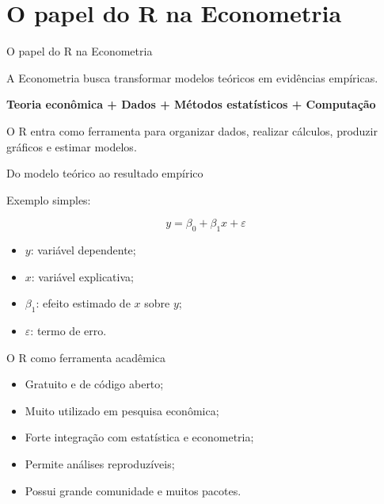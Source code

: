 \documentclass[11pt]{beamer}
\begin{document}
	\section{O papel do R na Econometria}
	
	\begin{frame}{O papel do R na Econometria}
		
		A Econometria busca transformar modelos teóricos em evidências empíricas.
		
		\vspace{0.4cm}
		
		\begin{center}
			\textbf{Teoria econômica + Dados + Métodos estatísticos + Computação}
		\end{center}
		
		\vspace{0.4cm}
		
		O R entra como ferramenta para organizar dados, realizar cálculos, produzir gráficos e estimar modelos.
		
	\end{frame}
	
	\begin{frame}{Do modelo teórico ao resultado empírico}
		
		Exemplo simples:
		
		\[
		y = \beta_0 + \beta_1x + \varepsilon
		\]
		
		\vspace{0.3cm}
		
		\begin{itemize}
			\item $y$: variável dependente;
			\item $x$: variável explicativa;
			\item $\beta_1$: efeito estimado de $x$ sobre $y$;
			\item $\varepsilon$: termo de erro.
		\end{itemize}
		
	\end{frame}
	
	\begin{frame}{O R como ferramenta acadêmica}
		
		\begin{itemize}
			\item Gratuito e de código aberto;
			\item Muito utilizado em pesquisa econômica;
			\item Forte integração com estatística e econometria;
			\item Permite análises reproduzíveis;
			\item Possui grande comunidade e muitos pacotes.
		\end{itemize}
		
	\end{frame}
	
\end{document}
